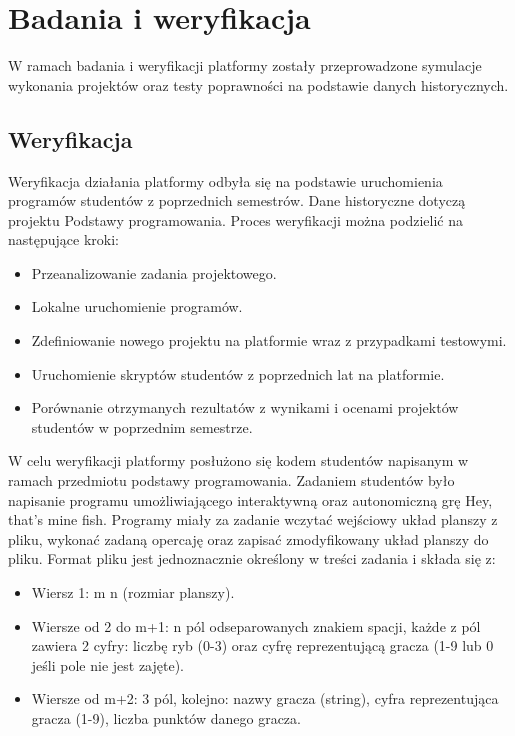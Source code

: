 \chapter{Badania i weryfikacja}
\label{chapter:research}

W ramach badania i weryfikacji platformy zostały przeprowadzone symulacje wykonania projektów oraz testy poprawności na podstawie danych historycznych.

\section{Weryfikacja}

Weryfikacja działania platformy odbyła się na podstawie uruchomienia programów studentów z poprzednich semestrów.
Dane historyczne dotyczą projektu Podstawy programowania.
Proces weryfikacji można podzielić na następujące kroki:
\begin{itemize}
    \item Przeanalizowanie zadania projektowego.
    \item Lokalne uruchomienie programów.
    \item Zdefiniowanie nowego projektu na platformie wraz z przypadkami testowymi.
    \item Uruchomienie skryptów studentów z poprzednich lat na platformie.
    \item Porównanie otrzymanych rezultatów z wynikami i ocenami projektów studentów w poprzednim semestrze.
\end{itemize}

W celu weryfikacji platformy posłużono się kodem studentów napisanym w ramach przedmiotu podstawy programowania.
Zadaniem studentów było napisanie programu umożliwiającego interaktywną oraz autonomiczną grę Hey, that’s mine fish.
Programy miały za zadanie wczytać wejściowy układ planszy z pliku, wykonać zadaną opercaję oraz zapisać zmodyfikowany układ planszy do pliku.
Format pliku jest jednoznacznie określony w treści zadania i składa się z:
\begin{itemize}
    \item Wiersz 1: m n (rozmiar planszy).
    \item Wiersze od 2 do m+1: n pól odseparowanych znakiem spacji, każde z pól zawiera 2 cyfry: liczbę ryb (0-3) oraz cyfrę reprezentującą gracza (1-9 lub 0 jeśli pole nie jest zajęte).
    \item Wiersze od m+2: 3 pól, kolejno: nazwy gracza (string), cyfra reprezentująca gracza (1-9), liczba punktów danego gracza.
\end{itemize}

